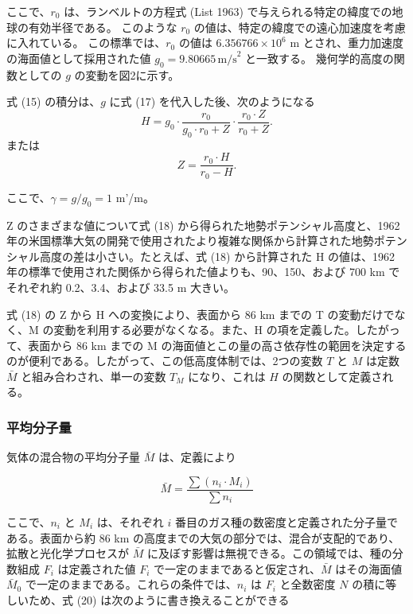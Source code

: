 \documentclass{article}
\begin{document}
ここで、$r_0$ は、ランベルトの方程式 (List 1963) で与えられる特定の緯度での地球の有効半径である。
このような $r_0$ の値は、特定の緯度での遠心加速度を考慮に入れている。
この標準では、$r_0$ の値は $6.356766 \times 10^6$ m とされ、重力加速度の海面値として採用された値 $g_0 = 9.80665 \, \text{m/s}^2$ と一致する。
幾何学的高度の関数としての $g$ の変動を図2に示す。

式 (15) の積分は、$g$ に式 (17) を代入した後、次のようになる
\begin{equation}
 H = g_0 \cdot \frac{r_0}{g_0 \cdot r_0 + Z} \cdot \frac{r_0 \cdot Z}{r_0 + Z}. \tag{18}
\end{equation}
または
\begin{equation}
 Z = \frac{r_0 \cdot H}{r_0 - H}. \tag{19}
\end{equation}

ここで、$\gamma = g/g_0 = 1$ m'/m。

Z のさまざまな値について式 (18) から得られた地勢ポテンシャル高度と、1962 年の米国標準大気の開発で使用されたより複雑な関係から計算された地勢ポテンシャル高度の差は小さい。たとえば、式 (18) から計算された H の値は、1962 年の標準で使用された関係から得られた値よりも、90、150、および 700 km でそれぞれ約 0.2、3.4、および 33.5 m 大きい。

式 (18) の Z から H への変換により、表面から 86 km までの T の変動だけでなく、M の変動を利用する必要がなくなる。また、H の項を定義した。したがって、表面から 86 km までの M の海面値とこの量の高さ依存性の範囲を決定するのが便利である。したがって、この低高度体制では、2つの変数 $T$ と $M$ は定数 $\bar{M}$ と組み合わされ、単一の変数 $T_M$ になり、これは $H$ の関数として定義される。

\subsubsection{平均分子量}
気体の混合物の平均分子量 $\bar{M}$ は、定義により

\begin{equation}
 \bar{M} = \frac{\sum (n_i \cdot M_i)}{\sum n_i} \tag{20}
\end{equation}

ここで、$n_i$ と $M_i$ は、それぞれ $i$ 番目のガス種の数密度と定義された分子量である。表面から約 86 km の高度までの大気の部分では、混合が支配的であり、拡散と光化学プロセスが $\bar{M}$ に及ぼす影響は無視できる。この領域では、種の分数組成 $F_i$ は定義された値 $F_i$ で一定のままであると仮定され、$\bar{M}$ はその海面値 $\bar{M}_0$ で一定のままである。これらの条件では、$n_i$ は $F_i$ と全数密度 $N$ の積に等しいため、式 (20) は次のように書き換えることができる
\end{document}
